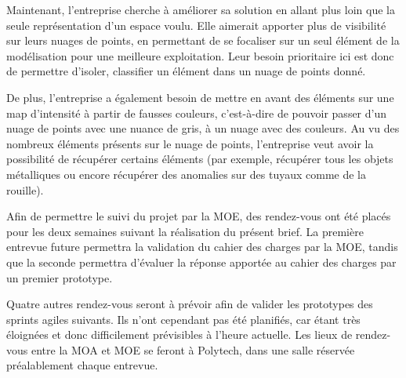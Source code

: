 \documentclass[12pt,titlepage,french]{article}
\begin{document}
Maintenant, l'entreprise cherche à améliorer sa solution en allant plus loin que la seule représentation d'un espace voulu. Elle aimerait apporter plus de visibilité sur leurs nuages de points, en permettant de se focaliser sur un seul élément de la modélisation pour une meilleure exploitation. Leur besoin prioritaire ici est donc de permettre d'isoler, classifier un élément dans un nuage de points donné.

De plus, l'entreprise a également besoin de mettre en avant des éléments sur une map d'intensité à partir de fausses couleurs, c'est-à-dire de pouvoir passer d'un nuage de points avec une nuance de gris, à un nuage avec des couleurs. Au vu des nombreux éléments présents sur le nuage de points, l'entreprise veut avoir la possibilité de récupérer certains éléments (par exemple, récupérer tous les objets métalliques ou encore récupérer des anomalies sur des tuyaux comme de la rouille).

Afin de permettre le suivi du projet par la MOE, des rendez-vous ont été placés pour les deux semaines suivant la réalisation du présent brief. La première entrevue future permettra la validation du cahier des charges par la MOE, tandis que la seconde permettra d'évaluer la réponse apportée au cahier des charges par un premier prototype. 

Quatre autres rendez-vous seront à prévoir afin de valider les prototypes des sprints agiles suivants. Ils n'ont cependant pas été planifiés, car étant très éloignées et donc difficilement prévisibles à l'heure actuelle. Les lieux de rendez-vous entre la MOA et MOE se feront à Polytech, dans une salle réservée préalablement chaque entrevue.
\end{document}
